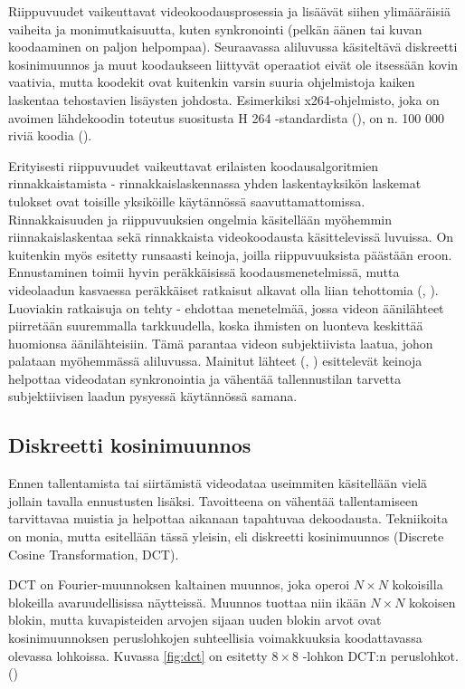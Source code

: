 Riippuvuudet vaikeuttavat videokoodausprosessia ja lisäävät siihen ylimääräisiä
vaiheita ja monimutkaisuutta, kuten synkronointi (pelkän äänen tai kuvan koodaaminen on paljon helpompaa).
Seuraavassa aliluvussa käsiteltävä diskreetti kosinimuunnos ja muut koodaukseen
liittyvät operaatiot eivät ole itsessään kovin vaativia, mutta koodekit ovat
kuitenkin varsin suuria ohjelmistoja kaiken laskentaa tehostavien lisäysten
johdosta. Esimerkiksi x264-ohjelmisto, joka on avoimen lähdekoodin toteutus
suositusta H 264 -standardista (\citealt{h264}), on n. 100 000 riviä koodia (\citealt{x264}).

Erityisesti riippuvuudet vaikeuttavat erilaisten koodausalgoritmien rinnakkaistamista -
rinnakkaislaskennassa yhden laskentayksikön laskemat tulokset ovat toisille
yksiköille käytännössä saavuttamattomissa. Rinnakkaisuuden ja riippuvuuksien
ongelmia käsitellään myöhemmin riinnakaislaskentaa sekä rinnakkaista
videokoodausta käsittelevissä luvuissa.
On kuitenkin myös esitetty runsaasti keinoja, joilla riippuvuuksista päästään
eroon. Ennustaminen toimii hyvin peräkkäisissä koodausmenetelmissä, mutta
videolaadun kasvaessa peräkkäiset ratkaisut alkavat olla liian tehottomia (\citealt{choi}, \citealt{xu}).
Luoviakin ratkaisuja on tehty - \citealt{lee} ehdottaa menetelmää, jossa videon
äänilähteet piirretään suuremmalla tarkkuudella, koska ihmisten on luonteva
keskittää huomionsa äänilähteisiin. Tämä parantaa videon subjektiivista laatua,
johon palataan myöhemmässä aliluvussa. Mainitut lähteet (\citealt{mujal},
\citealt{sync}) esittelevät keinoja helpottaa videodatan synkronointia ja vähentää
tallennustilan tarvetta subjektiivisen laadun pysyessä käytännössä samana.

\subsection{Diskreetti kosinimuunnos}

Ennen tallentamista tai siirtämistä videodataa useimmiten käsitellään vielä
jollain tavalla ennustusten lisäksi. Tavoitteena on vähentää tallentamiseen
tarvittavaa muistia ja helpottaa aikanaan tapahtuvaa dekoodausta. Tekniikoita
on monia, mutta esitellään tässä yleisin, eli diskreetti kosinimuunnos
(Discrete Cosine Transformation, DCT). 

DCT on Fourier-muunnoksen kaltainen muunnos, joka operoi $N \times N$
kokoisilla blokeilla avaruudellisissa näytteissä. Muunnos tuottaa niin
ikään $N \times N$ kokoisen blokin, mutta kuvapisteiden arvojen sijaan
uuden blokin arvot ovat kosinimuunnoksen peruslohkojen suhteellisia
voimakkuuksia koodattavassa olevassa lohkoissa. Kuvassa \ref{fig:dct} on esitetty
$8  \times 8$ -lohkon DCT:n peruslohkot. (\citealt{h264})

